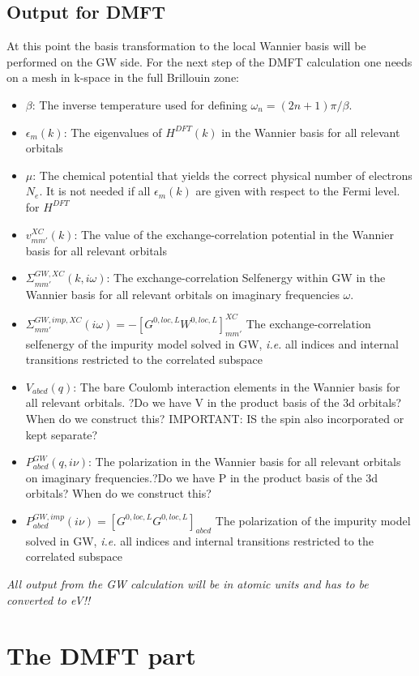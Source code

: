 \documentclass[12pt,a4paper]{scrartcl}
\numberwithin{equation}{section}
\newcommand{\cng}[1]{{\color{red}#1}}
\begin{document}
\subsection{Output for DMFT}
At this point the basis transformation to the local Wannier basis will be
performed on the GW side.
For the next step of the DMFT calculation one needs
on a mesh in k-space in the full Brillouin zone:
\begin{itemize}
\item $\beta$: The inverse temperature used for defining $\omega_n=(2n+1)\pi/\beta$.
\item $\epsilon_m(k)$: The eigenvalues  of $H^{DFT}(k)$ in the Wannier basis
for all relevant orbitals
\item $\mu$: The chemical potential that yields the correct physical number of electrons $N_e$. It is not needed if all $\epsilon_m(k)$ are given 
with respect to the Fermi level.
for $H^{DFT}$
\item $v^{XC}_{mm'}(k)$: The value of the exchange-correlation potential 
in the Wannier basis for all relevant orbitals
\item $\Sigma^{GW,XC}_{mm'}(k,i\omega)$: The exchange-correlation 
Selfenergy within GW in the Wannier basis for all relevant orbitals on imaginary frequencies $\omega$.
\item $\Sigma^{GW,imp,XC}_{mm'}(i\omega) = -[G^{0,loc,L}W^{0,loc,L}]^{XC}_{mm'}$
The exchange-correlation selfenergy of the impurity model solved in GW, \textit{i.e.}
all indices and internal transitions restricted to the correlated subspace
\item $V_{abcd}(q)$: The bare Coulomb interaction elements in the Wannier basis for all relevant orbitals.
\cng{?Do we have V in the product basis of the 3d orbitals? When do we construct this? IMPORTANT: IS the spin also incorporated or kept separate?}
\item $P^{GW}_{abcd}(q,i\nu)$: The polarization  in the Wannier basis for all relevant orbitals on imaginary frequencies.\cng{?Do we have P in the product basis of the 3d orbitals? When do we construct this?}
\item $P^{GW,imp}_{abcd}(i\nu) = [G^{0,loc,L}G^{0,loc,L}]_{abcd}$
The polarization of the impurity model solved in GW, \textit{i.e.}
all indices and internal transitions restricted to the correlated subspace
\end{itemize}
{\it All output from the GW calculation will be in atomic units and
has to be converted to eV!!}


\section{The DMFT part}
\end{document}
